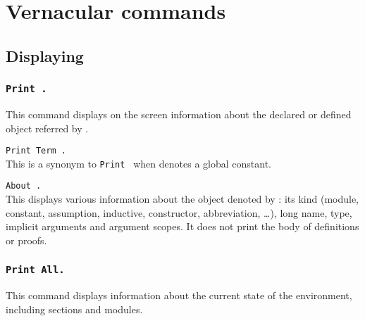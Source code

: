 \chapter[Vernacular commands]{Vernacular commands\label{Vernacular-commands}
\label{Other-commands}}

\section{Displaying}

\subsection[\tt Print {\qualid}.]{\tt Print {\qualid}.}
This command displays on the screen information about the declared or
defined object referred by {\qualid}.

\begin{ErrMsgs}
\item {\qualid} 
\end{ErrMsgs}

\begin{Variants}
\item {\tt Print Term {\qualid}.}
\\
This is a synonym to {\tt Print {\qualid}} when {\qualid} denotes a
global constant.

\item {\tt About {\qualid}.}
\label{About}
\\
This displays various information about the object denoted by {\qualid}:
its kind (module, constant, assumption, inductive,
constructor, abbreviation, \ldots), long name, type, implicit
arguments and argument scopes. It does not print the body of
definitions or proofs.

\end{Variants}

\subsection[\tt Print All.]{\tt Print All.}
This command displays information about the current state of the
environment, including sections and modules.

